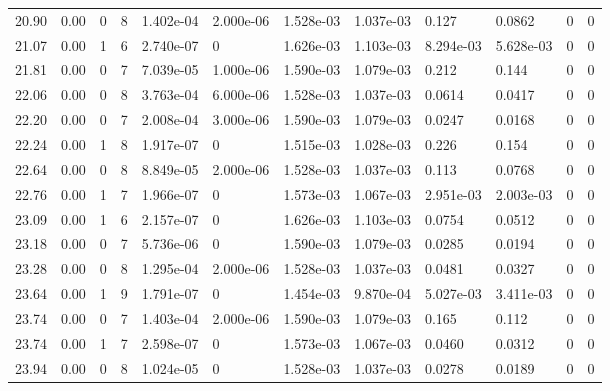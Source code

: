\documentclass[preview]{standalone}
\begin{document}
{{{\begin{tabular}{L{1.2cm}C{1.2cm} C{0.3cm}C{0.5cm} C{1.4cm}C{1.4cm} C{1.4cm}C{1.4cm} C{1.6cm}C{1.6cm} C{1.6cm}C{1.6cm}}
  20.90  &  0.00  & 0     &  8 &  1.402e-04  & 2.000e-06  &  1.528e-03&   1.037e-03& 0.127 & 0.0862   &  0 & 0  \\ 
  21.07  &  0.00  & 1     &  6 &  2.740e-07  & 0  &  1.626e-03&   1.103e-03& 8.294e-03 & 5.628e-03   &  0 & 0  \\ 
  21.81  &  0.00  & 0     &  7 &  7.039e-05  & 1.000e-06  &  1.590e-03&   1.079e-03& 0.212 & 0.144   &  0 & 0  \\ 
  22.06  &  0.00  & 0     &  8 &  3.763e-04  & 6.000e-06  &  1.528e-03&   1.037e-03& 0.0614 & 0.0417   &  0 & 0  \\ 
  22.20  &  0.00  & 0     &  7 &  2.008e-04  & 3.000e-06  &  1.590e-03&   1.079e-03& 0.0247 & 0.0168   &  0 & 0  \\ 
  22.24  &  0.00  & 1     &  8 &  1.917e-07  & 0  &  1.515e-03&   1.028e-03& 0.226 & 0.154   &  0 & 0  \\ 
  22.64  &  0.00  & 0     &  8 &  8.849e-05  & 2.000e-06  &  1.528e-03&   1.037e-03& 0.113 & 0.0768   &  0 & 0  \\ 
  22.76  &  0.00  & 1     &  7 &  1.966e-07  & 0  &  1.573e-03&   1.067e-03& 2.951e-03 & 2.003e-03   &  0 & 0  \\ 
  23.09  &  0.00  & 1     &  6 &  2.157e-07  & 0  &  1.626e-03&   1.103e-03& 0.0754 & 0.0512   &  0 & 0  \\ 
  23.18  &  0.00  & 0     &  7 &  5.736e-06  & 0  &  1.590e-03&   1.079e-03& 0.0285 & 0.0194   &  0 & 0  \\ 
  23.28  &  0.00  & 0     &  8 &  1.295e-04  & 2.000e-06  &  1.528e-03&   1.037e-03& 0.0481 & 0.0327   &  0 & 0  \\ 
  23.64  &  0.00  & 1     &  9 &  1.791e-07  & 0  &  1.454e-03&   9.870e-04& 5.027e-03 & 3.411e-03   &  0 & 0  \\ 
  23.74  &  0.00  & 0     &  7 &  1.403e-04  & 2.000e-06  &  1.590e-03&   1.079e-03& 0.165 & 0.112   &  0 & 0  \\ 
  23.74  &  0.00  & 1     &  7 &  2.598e-07  & 0  &  1.573e-03&   1.067e-03& 0.0460 & 0.0312   &  0 & 0  \\ 
  23.94  &  0.00  & 0     &  8 &  1.024e-05  & 0  &  1.528e-03&   1.037e-03& 0.0278 & 0.0189   &  0 & 0  \\ 
\hline 
\end{tabular} 

}}}
\end{document}
